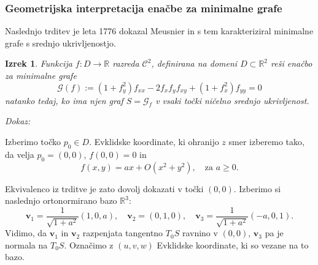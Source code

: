 \documentclass[8pt]{beamer}
\theoremstyle{definition}
\theoremstyle{remark}
\theoremstyle{plain}
\newtheorem{izrek}[definicija]{Izrek}
\numberwithin{equation}{section}  %
\begin{document}
\begin{frame}
    \frametitle{Geometrijska interpretacija enačbe za minimalne grafe}

    Naslednjo trditev je leta 1776 dokazal Meusnier in s tem karakteriziral minimalne grafe s srednjo ukrivljenostjo. 
    \begin{izrek}
        Funkcija $f: D \rightarrow \mathbb{R}$ razreda $\mathscr{C}^2$, definirana na domeni $D \subset \mathbb{R}^2$ reši enačbo za minimalne grafe 
        \begin{equation*}
            \mathscr{G}(f):=\left(1+f_y^2\right) f_{x x}-2 f_x f_y f_{x y}+\left(1+f_x^2\right) f_{y y}=0 
        \end{equation*}
        natanko tedaj, ko ima njen graf $S=\mathcal{G}_f$ v vsaki točki  ničelno srednjo ukrivljenost. 
    \end{izrek}

    \emph{Dokaz:}

    Izberimo točko $p_0\in D$. Evklidske koordinate, ki ohranijo $z$ smer izberemo tako, da velja $p_0=(0,0)$, $f(0,0)=0$ in 
    \begin{equation*}
        f(x, y)=a x+O\left(x^2+y^2\right), \quad \text{za }  a \geq 0.    
    \end{equation*}
    
    Ekvivalenco iz trditve je zato dovolj dokazati v točki $(0,0)$. Izberimo si naslednjo ortonormirano bazo $\mathbb{R}^3$:
    \begin{equation*}
        \mathbf{v}_1=\frac{1}{\sqrt{1+a^2}}(1,0, a), \quad \mathbf{v}_2=(0,1,0), \quad \mathbf{v}_3=\frac{1}{\sqrt{1+a^2}}(-a, 0,1).
    \end{equation*}
    Vidimo, da $\mathbf{v}_1$ in $\mathbf{v}_2$ razpenjata tangentno $T_0 S$ ravnino v $(0,0)$, $\mathbf{v}_3$ pa je normala na $T_0S$. Označimo z $(u, v, w)$ Evklidske koordinate, ki so vezane na to bazo. 
     
\end{frame}
\end{document}
